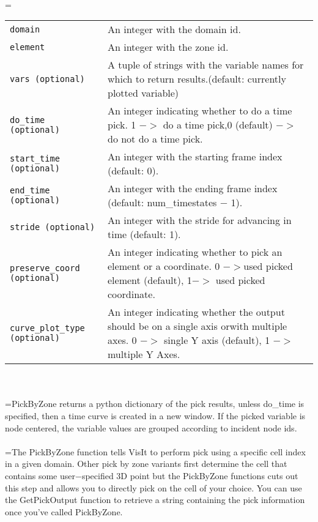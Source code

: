 \documentclass[10pt,a4paper]{report}
\begin{document}
 \\ 
\hangindent=\parindent 
\begin{tabular}{lp{9cm}}
\verb!domain! & An integer with the domain id. \\
\verb!element! & An integer with the zone id. \\
\verb!vars (optional)! & A tuple of strings with the variable names for which to return results.(default: currently plotted variable) \\
\verb!do_time (optional)! & An integer indicating whether to do a time pick. 1 $-$$>$ do a time pick,0 (default) $-$$>$ do not do a time pick. \\
\verb!start_time (optional)! & An integer with the starting frame index (default: 0). \\
\verb!end_time (optional)! & An integer with the ending frame index (default: num\_timestates $-$ 1). \\
\verb!stride (optional)! & An integer with the stride for advancing in time (default: 1). \\
\verb!preserve_coord (optional)! & An integer indicating whether to pick an element or a coordinate. 0 $-$$>$used picked element (default), 1$-$$>$ used picked coordinate. \\
\verb!curve_plot_type (optional)! & An integer indicating whether the output should be on a single axis orwith multiple axes. 0 $-$$>$ single Y axis (default), 1 $-$$>$ multiple Y Axes. \\
\end{tabular} \\[-2mm]


 \\ 
\hangindent=\parindent PickByZone returns a python dictionary of the pick results, unless do\_time is specified, then a time curve is created in a new window. If the picked variable is node centered, the variable values are grouped according to incident node ids. \\[-3mm] 

 \\ 
\hangindent=\parindent The PickByZone function tells VisIt to perform pick using a specific cell index in a given domain. Other pick by zone variants first determine the cell that contains some user$-$specified 3D point but the PickByZone functions cuts out this step and allows you to directly pick on the cell of your choice. You can use the GetPickOutput function to retrieve a string containing the pick information once you've called PickByZone. \\[-3mm] 
\end{document}
